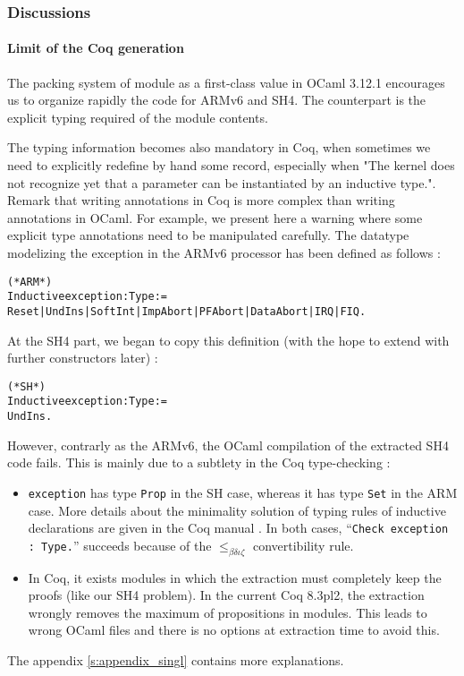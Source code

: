 \documentclass[a4paper, 11pt]{article}
\newenvironment{coq}
  {%
   \begin{alltt}
   \footnotesize} %% 8.3pl2 (April 2011)
  {\end{alltt} %
  }
\newcommand{\ocaml}{OCaml 3.12.1\xspace}
\newcommand{\coqc}{Coq 8.3pl2\xspace}
\newcommand{\coqkernel}{"The kernel does not recognize yet that a parameter can be instantiated by an inductive type."}
\begin{document}
\subsubsection{Discussions}

\paragraph{Limit of the Coq generation}
The packing system of module as a first-class value in \ocaml encourages us to organize rapidly the code for ARMv6 and SH4. The counterpart is the explicit typing required of the module contents. 

The typing information becomes also mandatory in Coq, when sometimes we need to explicitly redefine by hand some record, especially when \coqkernel. Remark that writing annotations in Coq is more complex than writing annotations in OCaml. For example, we present here a warning where some explicit type annotations need to be manipulated carefully. The datatype modelizing the exception in the ARMv6 processor has been defined as follows :
\begin{coq}
(* ARM *)
Inductive exception : Type :=
  Reset | UndIns | SoftInt | ImpAbort | PFAbort | DataAbort | IRQ | FIQ.
\end{coq}
At the SH4 part, we began to copy this definition (with the hope to extend with further constructors later) :
\begin{coq}
(* SH *)
Inductive exception : Type :=
  UndIns.
\end{coq}
However, contrarly as the ARMv6, the OCaml compilation of the extracted SH4 code fails. This is mainly due to a subtlety in the Coq type-checking :
\begin{itemize}
\item \verb|exception| has type \verb|Prop| in the SH case, whereas it has type \verb|Set| in the ARM case. More details about the minimality solution of typing rules of inductive declarations are given in the Coq manual \cite{Coq:manual}. In both cases, ``\verb|Check exception : Type.|'' succeeds because of the $\leq_{\beta\delta\iota\zeta}$ convertibility rule.
\item In Coq, it exists modules in which the extraction must completely keep the proofs (like our SH4 problem). In the current \coqc, the extraction wrongly removes the maximum of propositions in modules. This leads to wrong OCaml files and there is no options at extraction time to avoid this.
\end{itemize}
The appendix \ref{s:appendix_singl} contains more explanations.
\end{document}
